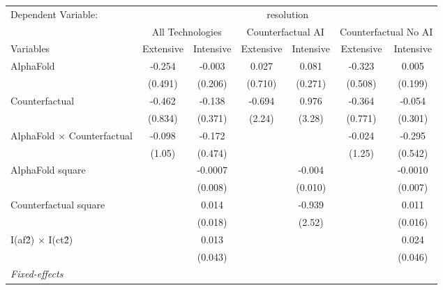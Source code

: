 \begingroup
\centering
\begin{tabular}{lcccccc}
   \tabularnewline \midrule \midrule
   Dependent Variable: & \multicolumn{6}{c}{resolution}\\
 & \multicolumn{2}{c}{All Technologies} & \multicolumn{2}{c}{Counterfactual AI} & \multicolumn{2}{c}{Counterfactual No AI} \\
\cmidrule(lr){1-1}\cmidrule(lr){2-3} \cmidrule(lr){4-5} \cmidrule(lr){6-7}
Variables & \multicolumn{1}{c}{Extensive} & \multicolumn{1}{c}{Intensive} & \multicolumn{1}{c}{Extensive} & \multicolumn{1}{c}{Intensive} & \multicolumn{1}{c}{Extensive} & \multicolumn{1}{c}{Intensive} \\
\cmidrule(lr){1-1}\cmidrule(lr){2-2} \cmidrule(lr){3-3} \cmidrule(lr){4-4} \cmidrule(lr){5-5} \cmidrule(lr){6-6} \cmidrule(lr){7-7}
   AlphaFold                          & -0.254  & -0.003  & 0.027   & 0.081   & -0.323  & 0.005\\   
                                      & (0.491) & (0.206) & (0.710) & (0.271) & (0.508) & (0.199)\\   
   Counterfactual                     & -0.462  & -0.138  & -0.694  & 0.976   & -0.364  & -0.054\\   
                                      & (0.834) & (0.371) & (2.24)  & (3.28)  & (0.771) & (0.301)\\   
   AlphaFold $\times$ Counterfactual  & -0.098  & -0.172  &         &         & -0.024  & -0.295\\   
                                      & (1.05)  & (0.474) &         &         & (1.25)  & (0.542)\\   
   AlphaFold square                   &         & -0.0007 &         & -0.004  &         & -0.0010\\   
                                      &         & (0.008) &         & (0.010) &         & (0.007)\\   
   Counterfactual square              &         & 0.014   &         & -0.939  &         & 0.011\\   
                                      &         & (0.018) &         & (2.52)  &         & (0.016)\\   
   I(af\^2) $\times$ I(ct\^2)         &         & 0.013   &         &         &         & 0.024\\   
                                      &         & (0.043) &         &         &         & (0.046)\\   
   \midrule
   \emph{Fixed-effects}\\

\end{tabular}

